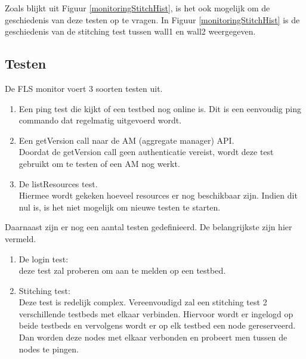 
Zoals blijkt uit Figuur \ref{monitoringStitchHist}, is het ook mogelijk om de geschiedenis van deze testen op te vragen. In Figuur \ref{monitoringStitchHist} is de geschiedenis van de stitching test tussen wall1 en wall2 weergegeven.

\clearpage
\subsection{Testen}
\npar
De FLS monitor voert 3 soorten testen uit.
\begin{enumerate}
\item Een ping test die kijkt of een testbed nog online is. Dit is een eenvoudig ping commando dat regelmatig uitgevoerd wordt. 
\item Een getVersion call naar de AM (aggregate manager) API.\\Doordat de getVersion call geen authenticatie vereist, wordt deze test gebruikt om te testen of een AM nog werkt.
\item De listResources test.\\Hiermee wordt gekeken hoeveel resources er nog beschikbaar zijn. Indien dit nul is, is het niet mogelijk om nieuwe testen te starten.
\end{enumerate}
\npar
Daarnaast zijn er nog een aantal testen gedefinieerd. De belangrijkste zijn hier vermeld.
\begin{enumerate}
\item De login test:\\ deze test zal proberen om aan te melden op een testbed.
\item Stitching test:\\ Deze test is redelijk complex. Vereenvoudigd zal een stitching test 2 verschillende testbeds met elkaar verbinden. Hiervoor wordt er ingelogd op beide testbeds en vervolgens wordt er op elk testbed een node gereserveerd. Dan worden deze nodes met elkaar verbonden en probeert men tussen de nodes te pingen. 
\end{enumerate}
